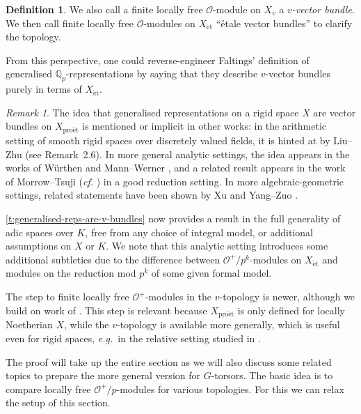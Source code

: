 \documentclass[10pt,a4paper]{article}
\theoremstyle{definition}
\newtheorem{Definition}[thm]{Definition}
\theoremstyle{remark}
\newtheorem{Remark}[thm]{Remark}
\renewcommand{\O}{\mathcal{O}}
\newcommand{\Q}{\mathbb{Q}}
\newcommand{\et}{{\operatorname{\acute{e}t}}}
\newcommand{\proet}{{\operatorname{pro\acute{e}t}}}
\numberwithin{equation}{section}
\begin{document}
\begin{Definition}
	We also call a finite locally free $\O$-module on $X_{v}$  a \emph{$v$-vector bundle}. We then call finite locally free $\O$-modules on $X_{\et}$ ``\'etale vector bundles'' to clarify the topology.
\end{Definition}


From this perspective, one could reverse-engineer Faltings' definition of generalised $\Q_p$-representations by saying that they describe $v$-vector bundles purely in terms of $X_{\et}$.

\begin{Remark}
  The idea that generalised representations on a rigid space $X$ are vector bundles on $X_{\proet}$  is mentioned or implicit in other works:  in the arithmetic setting of smooth rigid spaces over discretely valued fields, it is hinted at by Liu--Zhu \cite{LiuZhu_RiemannHilbert} (see Remark~2.6). In more general analytic  settings, the idea appears in the works of W\"urthen \cite[Introduction, p.~4006]{wuerthen_vb_on_rigid_var} and Mann--Werner \cite{MannWerner_LocSys_p-adVB}, and a related result appears in the work of Morrow--Tsuji (\textit{cf.} \cite[Theorem 5.7]{MorrowTsuji}) in a good reduction setting. In more algebraic-geometric settings, related statements have been shown by Xu  \cite[Section~3.29]{XuTransport_parallele} and Yang--Zuo \cite[Lemma~2.10]{YangZuo-padicSimpson}.
	
	 \cref{t:generalised-reps-are-v-bundles} now provides a result in the full generality of adic spaces over $K$, free from any choice of integral model, or additional assumptions on $X$ or $K$. We note that this analytic setting introduces some additional subtleties due to the difference between $\O^+/p^k$-modules on $X_{\et}$ and modules on the reduction mod $p^k$ of some given formal model.
	
	The step to finite locally free $\O^+$-modules in the $v$-topology is newer, although we build on work of \cite{MannWerner_LocSys_p-adVB}. This step is relevant because $X_{\proet}$  is only defined for locally Noetherian $X$, while the $v$-topology is available more generally, which is useful even for rigid spaces, \textit{e.g.}~in the relative setting studied in \cite{heuer-sheafified-paCS}.
\end{Remark}

The proof will take up the entire section as we will also discuss some related topics to prepare the more general version for $G$-torsors.
The basic idea is to compare locally free $\O^+/p$-modules for various topologies. For this we can relax the setup of this section. 
\end{document}

